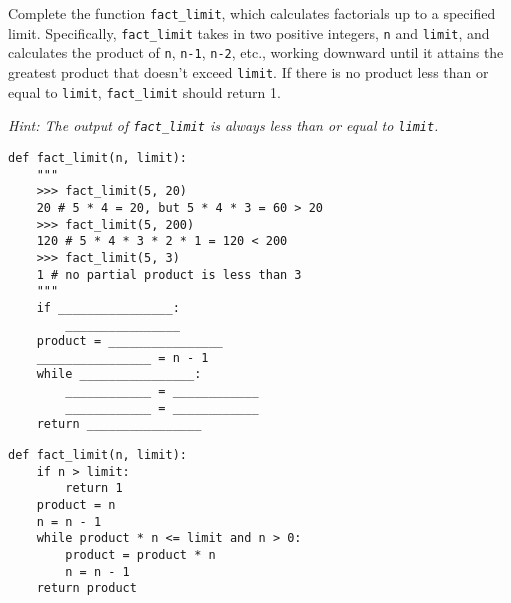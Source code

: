 \begin{blocksection}
\question Complete the function \lstinline{fact_limit}, which calculates factorials up to a specified limit. Specifically, \lstinline{fact_limit} takes in two positive integers, \lstinline{n} and \lstinline{limit}, and calculates the product of \lstinline{n}, \lstinline{n-1}, \lstinline{n-2}, etc., working downward until it attains the greatest product that doesn't exceed \lstinline{limit}. If there is no product less than or equal to \lstinline{limit}, \lstinline{fact_limit} should return 1. 

\emph{Hint: The output of \lstinline{fact_limit} is always less than or equal to \lstinline{limit}.}

\begin{lstlisting}
def fact_limit(n, limit):
    """
    >>> fact_limit(5, 20) 
    20 # 5 * 4 = 20, but 5 * 4 * 3 = 60 > 20
    >>> fact_limit(5, 200) 
    120 # 5 * 4 * 3 * 2 * 1 = 120 < 200
    >>> fact_limit(5, 3) 
    1 # no partial product is less than 3
    """
    if ________________:
        ________________
    product = ________________
    ________________ = n - 1
    while ________________:
        ____________ = ____________  
        ____________ = ____________
    return ________________

\end{lstlisting}
\end{blocksection}

\begin{blocksection}
\begin{solution}
\begin{lstlisting}
def fact_limit(n, limit):
    if n > limit:
        return 1
    product = n
    n = n - 1
    while product * n <= limit and n > 0:
        product = product * n  
        n = n - 1
    return product
\end{lstlisting}
\end{solution}
\end{blocksection}